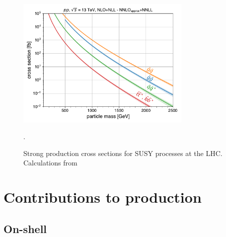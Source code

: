\begin{figure}[htb!]
    \centering
    \includegraphics[width=0.75\textwidth]{figs/ssan/plot_susy_xsecs}
\caption{Strong production cross sections for SUSY processes at the LHC. Calculations from \cite{THEORY:SUSYxsecs}}.
\label{fig:susy_xsecs}
\end{figure}


\section{Contributions to \tttt production}

\subsection{On-shell}

